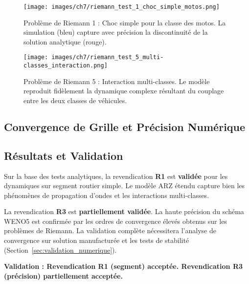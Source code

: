 \begin{figure}[htbp]
    \centering
    \texttt{[image: images/ch7/riemann\_test\_1\_choc\_simple\_motos.png]}
    \caption{Problème de Riemann 1 : Choc simple pour la classe des motos. La simulation (bleu) capture avec précision la discontinuité de la solution analytique (rouge).}
    \label{fig:riemann_choc_simple}
\end{figure}

\begin{figure}[htbp]
    \centering
    \texttt{[image: images/ch7/riemann\_test\_5\_multi-classes\_interaction.png]}
    \caption{Problème de Riemann 5 : Interaction multi-classes. Le modèle reproduit fidèlement la dynamique complexe résultant du couplage entre les deux classes de véhicules.}
    \label{fig:riemann_interaction_multiclasse}
\end{figure}


\subsection{Convergence de Grille et Précision Numérique}
\label{subsec:convergence_grille}

\subsection{Résultats et Validation}
\label{subsec:resultats_segment}

Sur la base des tests analytiques, la revendication \textbf{R1} est \textbf{validée} pour les dynamiques sur segment routier simple. Le modèle ARZ étendu capture bien les phénomènes de propagation d'ondes et les interactions multi-classes.

La revendication \textbf{R3} est \textbf{partiellement validée}. La haute précision du schéma WENO5 est confirmée par les ordres de convergence élevés obtenus sur les problèmes de Riemann. La validation complète nécessitera l'analyse de convergence sur solution manufacturée et les tests de stabilité (Section~\ref{sec:validation_numerique}).

\textbf{Validation : Revendication R1 (segment) acceptée. Revendication R3 (précision) partiellement acceptée.}


